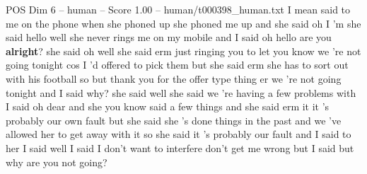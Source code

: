 \begin{textsample}{POS Dim 6 – human – Score 1.00 – human/t000398\_human.txt}  \label{ex:f6_pos_020}
I mean said to me on the phone when she phoned up she phoned me up and she said oh I 'm she said hello well she never rings me on my mobile and I said oh hello are you \textbf{alright}? she said oh well she said erm just ringing you to let you know we 're not going tonight cos I 'd offered to pick them but she said erm she has to sort out with his football so but thank you for the offer type thing er we 're not going tonight and I said why? she said well she said we 're having a few problems with I said oh dear and she you know said a few things and she said erm it it 's probably our own fault but she said she 's done things in the past and we 've allowed her to get away with it so she said it 's probably our fault and I said to her I said well I said I don't want to interfere don't get me wrong but I said but why are you not going?

\end{textsample}
